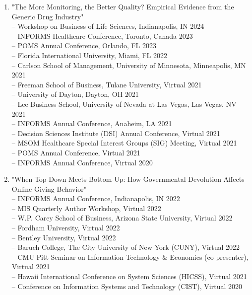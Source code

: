 \documentclass[margin,line]{resume}
\begin{document}
\begin{resume}
\begin{enumerate}[topsep=0pt, leftmargin=*]
         \item "The More Monitoring, the Better Quality? Empirical Evidence from the Generic Drug Industry"\\[0.3em]
         -- Workshop on Business of Life Sciences, Indianapolis, IN \hfill   2024\\
         -- INFORMS Healthcare Conference, Toronto, Canada \hfill   2023\\
  	     -- POMS Annual Conference, Orlando, FL \hfill   2023\\
               -- Florida International University, Miami, FL \hfill 2022\\
               -- Carlson School of Management, University of Minnesota, Minneapolis, MN \hfill 2021\\
               -- Freeman School of Business, Tulane University, Virtual \hfill 2021\\
               -- University of Dayton, Dayton, OH \hfill 2021\\
               -- Lee Business School, University of Nevada at Las Vegas, Las Vegas, NV \hfill 2021\\
               -- INFORMS Annual Conference, Anaheim, LA \hfill 2021\\
               -- Decision Sciences Institute (DSI) Annual Conference, Virtual \hfill 2021\\
               -- MSOM Healthcare Special Interest Groups (SIG) Meeting, Virtual \hfill2021\\
               -- POMS Annual Conference, Virtual \hfill2021\\
               -- INFORMS Annual Conference, Virtual \hfill2020\\

 	     \item "When Top-Down Meets Bottom-Up: How Governmental Devolution Affects Online Giving Behavior"\\[0.3em]\newpage
 	          -- INFORMS Annual Conference, Indianapolis, IN \hfill  2022\\
 	          -- MIS Quarterly Author Workshop, Virtual \hfill 2022\\
 	           -- W.P. Carey School of Business, Arizona State University, Virtual \hfill2022\\
 	           -- Fordham University, Virtual  \hfill2022\\
 	           -- Bentley University, Virtual  \hfill2022\\
 	           -- Baruch College, The City University of New York (CUNY), Virtual \hfill2022\\
 	           -- CMU-Pitt Seminar on Information Technology \& Economics (co-presenter), Virtual \hfill2021\\
 	           -- Hawaii International Conference on System Sciences (HICSS), Virtual \hfill2021\\
 	           -- Conference on Information Systems and Technology (CIST), Virtual \hfill2020\\ 	      



\end{enumerate}
\end{resume}
\end{document}
